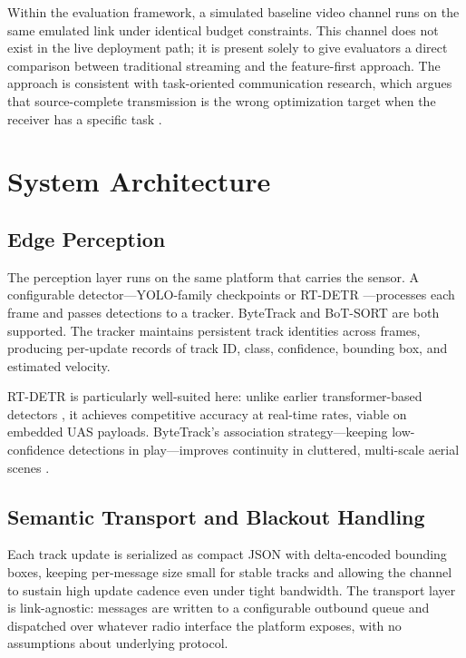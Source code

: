 \documentclass[11pt]{article}
\begin{document}
Within the evaluation framework, a simulated baseline video channel
runs on the same emulated link under identical budget constraints.
This channel does not exist in the live deployment path; it is present
solely to give evaluators a direct comparison between traditional
streaming and the feature-first approach. The approach is consistent
with task-oriented communication research, which argues that
source-complete transmission is the wrong optimization target when the
receiver has a specific task \cite{semantic_survey_2021}.

\section{System Architecture}

\subsection{Edge Perception}

The perception layer runs on the same platform that carries the sensor.
A configurable detector---YOLO-family checkpoints or RT-DETR
\cite{rtdetr2023}---processes each frame and passes detections to a
tracker. ByteTrack \cite{bytetrack2022} and BoT-SORT
\cite{botsort2022} are both supported. The tracker maintains
persistent track identities across frames, producing per-update records
of track ID, class, confidence, bounding box, and estimated velocity.

RT-DETR is particularly well-suited here: unlike earlier
transformer-based detectors \cite{detr2020}, it achieves competitive
accuracy at real-time rates, viable on embedded UAS payloads.
ByteTrack's association strategy---keeping low-confidence detections in
play---improves continuity in cluttered, multi-scale aerial scenes
\cite{bytetrack2022}.

\subsection{Semantic Transport and Blackout Handling}

Each track update is serialized as compact JSON with delta-encoded
bounding boxes, keeping per-message size small for stable tracks and
allowing the channel to sustain high update cadence even under tight
bandwidth. The transport layer is link-agnostic: messages are written
to a configurable outbound queue and dispatched over whatever radio
interface the platform exposes, with no assumptions about underlying
protocol.
\end{document}
